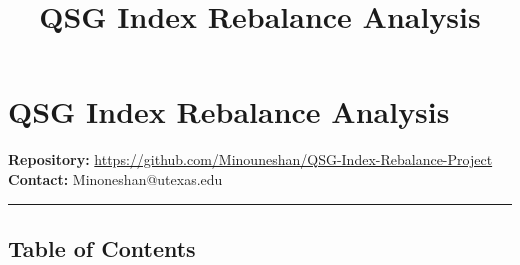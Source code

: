 \documentclass[11pt]{article}
\title{QSG Index Rebalance Analysis}
\begin{document}
    
    \maketitle
    
    

    
    \section*{QSG Index Rebalance
Analysis}\label{qsg-index-rebalance-analysis}

\textbf{Repository:}
\url{https://github.com/Minouneshan/QSG-Index-Rebalance-Project}\\
\textbf{Contact:} Minoneshan@utexas.edu

\begin{center}\rule{0.5\linewidth}{0.5pt}\end{center}

    \subsection*{Table of Contents}\label{table-of-contents}
\end{document}
